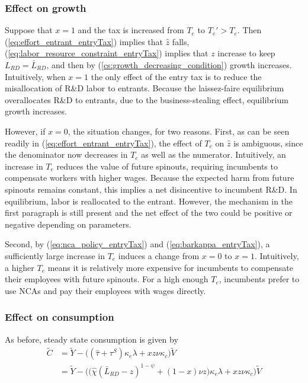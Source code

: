 \documentclass[11pt,english]{article}
\theoremstyle{remark}
\begin{document}
\subsubsection{Effect on growth}

Suppose that $x = 1$ and the tax is increased from $T_e$ to $T_e' > T_e$. Then (\ref{eq:effort_entrant_entryTax}) implies that $\hat{z}$ falls, (\ref{eq:labor_resource_constraint_entryTax}) implies that $z$ increase to keep $L_{RD} = \bar{L}_{RD}$, and then by (\ref{cs:growth_decreasing_condition}) growth increases. Intuitively, when $x = 1$ the only effect of the entry tax is to reduce the misallocation of R\&D labor to entrants. Because the laissez-faire equilibrium overallocates R\&D to entrants, due to the business-stealing effect, equilibrium growth increases.

However, if $x = 0$, the situation changes, for two reasons. First, as can be seen readily in (\ref{eq:effort_entrant_entryTax}), the effect of $T_e$ on $\hat{z}$ is ambiguous, since the denominator now decreases in $T_e$ as well as the numerator. Intuitively, an increase in $T_e$ reduces the value of future spinouts, requiring incumbents to compensate workers with higher wages. Because the expected harm from future spinouts remains constant, this implies a net disincentive to incumbent R\&D. In equilibrium, labor is reallocated to the entrant. However, the mechanism in the first paragraph is still present and the net effect of the two could be positive or negative depending on parameters.

Second, by (\ref{eq:nca_policy_entryTax}) and (\ref{eq:barkappa_entryTax}), a sufficiently large increase in $T_e$ induces a change from $x = 0$ to $x = 1$. Intuitively, a higher $T_e$ means it is relatively more expensive for incumbents to compensate their employees with future spinouts. For a high enough $T_e$, incumbents prefer to use NCAs and pay their employees with wages directly.

\subsubsection{Effect on consumption}

As before, steady state consumption is given by
\begin{align}
\tilde{C} &= \tilde{Y} - \Big( (\hat{\tau}  + \tau^S)\kappa_e \lambda + x z \nu \kappa_c \Big) \tilde{V} \\
&= \tilde{Y} - \Big( \big( \hat{\chi} (\bar{L}_{RD} - z)^{1-\psi} + (1-x) \nu z \big) \kappa_e \lambda + x z \nu \kappa_c \Big) \tilde{V}  \label{cs:scen3:consumption_eq}
\end{align}
\end{document}
